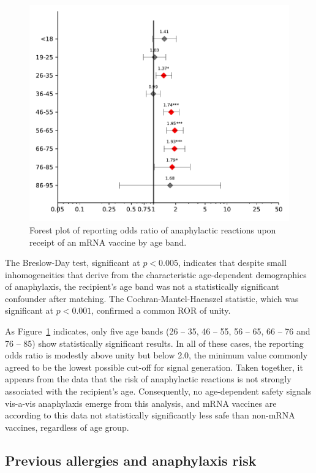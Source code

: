 \documentclass{article}
\begin{document}
\begin{figure}[H]
\centering
\includegraphics[width=12.5 cm]{forest_plot_of_anaphylaxis_by_age}
\caption{Forest plot of reporting odds ratio of anaphylactic reactions upon receipt of an mRNA vaccine by age band.}
\label{fig:age-forest-plot}
\end{figure}

The Breslow-Day test, significant at $p < 0.005$, indicates that despite small inhomogeneities that derive from the characteristic age-dependent demographics of anaphylaxis,\cite{lee2011anaphylaxis} the recipient's age band was not a statistically significant confounder after matching.
The Cochran-Mantel-Haenszel statistic, which was significant at $p < 0.001$, confirmed a common ROR of unity.

As Figure~\ref{fig:age-forest-plot} indicates, only five age bands (26 -- 35, 46 -- 55, 56 -- 65, 66 -- 76 and 76 -- 85) show statistically significant results.
In all of these cases, the reporting odds ratio is modestly above unity but below 2.0, the minimum value commonly agreed to be the lowest possible cut-off for signal generation.
Taken together, it appears from the data that the risk of anaphylactic reactions is not strongly associated with the recipient's age.
Consequently, no age-dependent safety signals vis-a-vis anaphylaxis emerge from this analysis, and mRNA vaccines are according to this data not statistically significantly less safe than non-mRNA vaccines, regardless of age group.

\subsection{Previous allergies and anaphylaxis risk}
\end{document}

